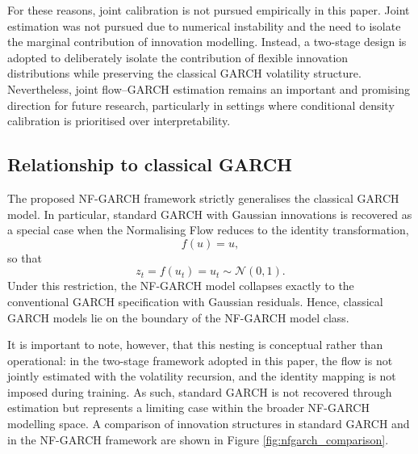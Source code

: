 \documentclass[risks,article,submit,pdftex,moreauthors]{Definitions/mdpi}
\begin{document}
For these reasons, joint calibration is not pursued empirically in this paper. Joint estimation was not pursued due to numerical instability and the need to isolate the marginal contribution of innovation modelling. Instead, a two-stage design is adopted to deliberately isolate the contribution of flexible innovation distributions while preserving the classical GARCH volatility structure. Nevertheless, joint flow--GARCH estimation remains an important and promising direction for future research, particularly in settings where conditional density calibration is prioritised over interpretability.

\subsection{Relationship to classical GARCH}
The proposed NF-GARCH framework strictly generalises the classical GARCH model. In particular, standard GARCH with Gaussian innovations is recovered as a special case when the Normalising Flow reduces to the identity transformation,
\[
f(u) = u,
\]
so that
\[
z_t = f(u_t) = u_t \sim \mathcal{N}(0,1).
\]
Under this restriction, the NF-GARCH model collapses exactly to the conventional GARCH specification with Gaussian residuals. Hence, classical GARCH models lie on the boundary of the NF-GARCH model class.

It is important to note, however, that this nesting is conceptual rather than operational: in the two-stage framework adopted in this paper, the flow is not jointly estimated with the volatility recursion, and the identity mapping is not imposed during training. As such, standard GARCH is not recovered through estimation but represents a limiting case within the broader NF-GARCH modelling space. A comparison of innovation structures in standard GARCH and in the NF-GARCH framework are shown in Figure \ref{fig:nfgarch_comparison}.
\end{document}
